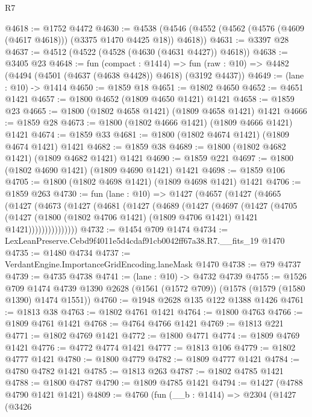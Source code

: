 \begin{lexlean}{R7}
\begin{coremodule}
@4618 := @1752 @4472
@4630 := @4538 (@4546 (@4552 (@4562 (@4576 (@4609 (@4617 @4618))) (@3375 @1470 @4425 @18)) @4618))
@4631 := @3397 @28
@4637 := @4512 (@4522 (@4528 (@4630 (@4631 @4427)) @4618))
@4638 := @3405 @23
@4648 := fun (compact : @1414) =>
  fun (raw : @10) => @4482 (@4494 (@4501 (@4637 (@4638 @4428)) @4618) (@3192 @4437))
@4649 := (lane : @10) -> @1414
@4650 := @1859 @18
@4651 := @1802 @4650
@4652 := @4651 @1421
@4657 := @1800 @4652 (@1809 @4650 @1421) @1421
@4658 := @1859 @23
@4665 := @1800 (@1802 @4658 @1421) (@1809 @4658 @1421) @1421
@4666 := @1859 @28
@4673 := @1800 (@1802 @4666 @1421) (@1809 @4666 @1421) @1421
@4674 := @1859 @33
@4681 := @1800 (@1802 @4674 @1421) (@1809 @4674 @1421) @1421
@4682 := @1859 @38
@4689 := @1800 (@1802 @4682 @1421) (@1809 @4682 @1421) @1421
@4690 := @1859 @221
@4697 := @1800 (@1802 @4690 @1421) (@1809 @4690 @1421) @1421
@4698 := @1859 @106
@4705 := @1800 (@1802 @4698 @1421) (@1809 @4698 @1421) @1421
@4706 := @1859 @263
@4730 := fun (lane : @10) =>
  @1427
    (@4657
      (@1427
        (@4665
          (@1427
            (@4673
              (@1427
                (@4681
                  (@1427
                    (@4689
                      (@1427
                        (@4697
                          (@1427
                            (@4705
                              (@1427
                                (@1800
                                  (@1802 @4706 @1421)
                                  (@1809 @4706 @1421)
                                  @1421
                                  @1421)))))))))))))))
@4732 := @1454 @709 @1474
@4734 := LexLeanPreserve.Cebd9f4011e5d4cdaf91cb0042ff67a38.R7.__fits_19 @1470
@4735 := @1480 @4734
@4737 := VerdantEngine.ImportanceGridEncoding.laneMask @1470
@4738 := @79 @4737
@4739 := @4735 @4738
@4741 := (lane : @10) -> @4732 @4739
@4755 := @1526
    @709
    @1474
    @4739
    @1390
    @2628
    (@1561 (@1572 @709))
    (@1578 (@1579 (@1580 @1390) @1474 @1551))
@4760 := @1948 @2628 @135 @122 @1388 @1426
@4761 := @1813 @38
@4763 := @1802 @4761 @1421
@4764 := @1800 @4763
@4766 := @1809 @4761 @1421
@4768 := @4764 @4766 @1421
@4769 := @1813 @221
@4771 := @1802 @4769 @1421
@4772 := @1800 @4771
@4774 := @1809 @4769 @1421
@4776 := @4772 @4774 @1421
@4777 := @1813 @106
@4779 := @1802 @4777 @1421
@4780 := @1800 @4779
@4782 := @1809 @4777 @1421
@4784 := @4780 @4782 @1421
@4785 := @1813 @263
@4787 := @1802 @4785 @1421
@4788 := @1800 @4787
@4790 := @1809 @4785 @1421
@4794 := @1427 (@4788 @4790 @1421 @1421)
@4809 := @4760
    (fun (__b : @1414) =>
    @2304
      (@1427
        (@3426

\end{coremodule}
\end{lexlean}
